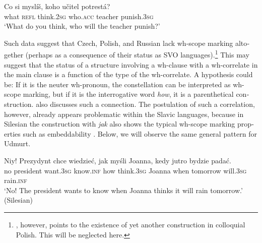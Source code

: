 \documentclass[output=paper,colorlinks,citecolor=brown]{langscibook}
\begin{document}
\begin{otherlanguage}{english}
\ea\label{ex:fanselow:19}
\ea     
\gll Co 	si 	           myslíš, 	koho 	učitel 	potrestá? \\
    what 	\textsc{refl} 	think.2\textsc{sg} 	who.\textsc{acc} 	teacher	punish.3\textsc{sg} \\
\glt ‘What do you think, who will the teacher punish?'
\label{ex:fanselow:19a}
\label{ex:fanselow:19b}
\z\z

\noindent Such data suggest that Czech, Polish, and Russian lack wh-scope marking altogether (perhaps as a consequence of their status as SVO languages).\footnote{\citet{Smiecinska2011}, however, points to the existence of yet another construction in colloquial Polish. This will be neglected here.
} This may suggest that the status of a structure involving a wh-clause with a wh-correlate in the main clause is a function of the type of the wh-correlate. A hypothesis could be: If it is the neuter wh-pronoun, the constellation can be interpreted as wh-scope marking, but if it is the interrogative word \textit{how}, it is a parenthetical construction. \citet{Fanselow2017a} also discusses such a connection. The postulation of such a correlation, however, already appears problematic within the Slavic languages, because in Silesian the construction with \textit{jak} also shows the typical wh-scope marking properties such as embeddability . Below, we will observe the same general pattern for Udmurt.

\ea \label{ex:fanselow:21}
\gll  Niy! 	Prezydynt 	chce 		wiedzieć, 	jak 	myśli 	Joanna, 	kedy 	jutro 	bydzie 	padać. \\
    no 	president 	want.3\textsc{sg} 	know.\textsc{inf} 	how 	think.3\textsc{sg} 	Joanna 	when 	tomorrow 	will.3\textsc{sg} 	rain.\textsc{inf} \\
    \glt    ‘No! The president wants to know when Joanna thinks it will rain tomorrow.' \hfill (Silesian)
    \z


\end{otherlanguage}
\end{document}
